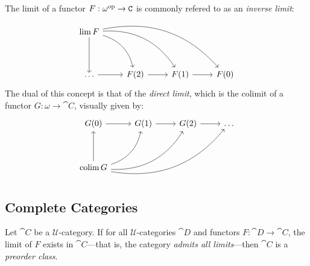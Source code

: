 \begin{example}
    \label{exp:inv-dir-limit}
    The limit of a functor \(F: \omega^{\mathrm{op}} \to \texttt C\) is commonly refered to as
    an \emph{inverse limit}:
    \[
        \begin{tikzcd}
            \Lim F \ar[dd] \ar[drd, bend left] \ar[drdr, bend left] \ar[rdrdr, bend left]
            &&& \\
            &&& \\
            \dots \ar[r] &F(2) \ar[r] &F(1) \ar[r] &F(0)
        \end{tikzcd}
    \]
    The dual of this concept is that of the \emph{direct limit}, which is the
    colimit of a functor \(G: \omega \to \cat C\), visually given by:
    \[
        \begin{tikzcd}
            G(0) \ar[r] &G(1) \ar[r] &G(2) \ar[r] &\dots \\
            &&&\\
            \Colim G
            \ar[uu] \ar[uru, bend right] \ar[urur, bend right] \ar[rurur, bend right]
            &&&
        \end{tikzcd}
    \]
\end{example}

\subsection{Complete Categories}

\begin{proposition}
    \label{prop:all-limits-is-preorder}
    Let \(\cat C\) be a \(\mathcal{U}\)-category. If for all
    \(\mathcal{U}\)-categories \(\cat D\) and functors \(F: \cat D \to \cat C\), the
    limit of \(F\) exists in \(\cat C\)---that is, the category \emph{admits all
        limits}---then \(\cat C\) is a \emph{preorder class}.
\end{proposition}

